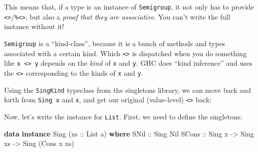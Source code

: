 \documentclass[]{article}
\newenvironment{Shaded}{}{}
\newcommand{\DataTypeTok}[1]{\textcolor[rgb]{0.56,0.13,0.00}{#1}}
\newcommand{\FunctionTok}[1]{\textcolor[rgb]{0.02,0.16,0.49}{#1}}
\newcommand{\KeywordTok}[1]{\textcolor[rgb]{0.00,0.44,0.13}{\textbf{#1}}}
\newcommand{\NormalTok}[1]{#1}
\newcommand{\OtherTok}[1]{\textcolor[rgb]{0.00,0.44,0.13}{#1}}
\begin{document}
This means that, if a type is an instance of \texttt{Semigroup}, it not only has
to provide
\texttt{\textless{}\textgreater{}}/\texttt{\%\textless{}\textgreater{}}, but
also a \emph{proof that they are associative}. You can't write the full instance
without it!

\texttt{Semigroup} is a ``kind-class'', because it is a bunch of methods and
types associated with a certain kind. Which \texttt{\textless{}\textgreater{}}
is dispatched when you do something like
\texttt{x\ \textless{}\textgreater{}\ y} depends on the \emph{kind} of
\texttt{x} and \texttt{y}. GHC does ``kind inference'' and uses the
\texttt{\textless{}\textgreater{}} corresponding to the kinds of \texttt{x} and
\texttt{y}.

Using the \texttt{SingKind} typeclass from the singletons library, we can move
back and forth from \texttt{Sing\ x} and \texttt{x}, and get our original
(value-level) \texttt{\textless{}\textgreater{}} back:

\begin{Shaded}
\end{Shaded}

Now, let's write the instance for \texttt{List}. First, we need to define the
singletons:

\begin{Shaded}
\begin{Highlighting}[]
\KeywordTok{data} \KeywordTok{instance} \DataTypeTok{Sing}\NormalTok{ (}\OtherTok{xs ::} \DataTypeTok{List}\NormalTok{ a) }\KeywordTok{where}
    \DataTypeTok{SNil}\OtherTok{  ::} \DataTypeTok{Sing} \DataTypeTok{Nil}
    \DataTypeTok{SCons}\OtherTok{ ::} \DataTypeTok{Sing}\NormalTok{ x }\OtherTok{->} \DataTypeTok{Sing}\NormalTok{ xs }\OtherTok{->} \DataTypeTok{Sing}\NormalTok{ (}\DataTypeTok{Cons}\NormalTok{ x xs)}
\end{Highlighting}
\end{Shaded}
\end{document}
